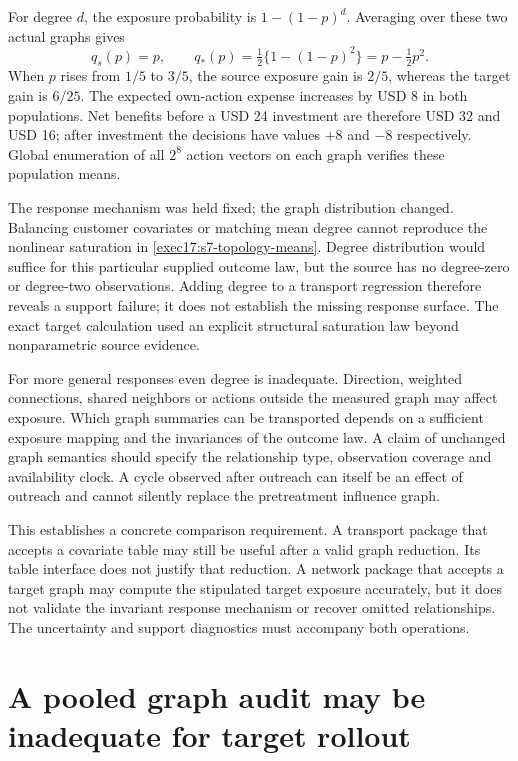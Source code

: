 For degree $d$, the exposure probability is $1-(1-p)^d$. Averaging over these
two actual graphs gives
\begin{equation}
 q_s(p)=p,\qquad q_*(p)=\tfrac12\{1-(1-p)^2\}
                    =p-\tfrac12p^2.
 \label{exec17:s7-topology-means}
\end{equation}
When $p$ rises from $1/5$ to $3/5$, the source exposure gain is $2/5$,
whereas the target gain is $6/25$. The expected own-action expense increases
by USD 8 in both populations. Net benefits before a USD 24 investment are
therefore USD 32 and USD 16; after investment the decisions have values
$+8$ and $-8$ respectively. Global enumeration of all $2^8$ action vectors
on each graph verifies these population means.\citep{exec17_s7_math}

The response mechanism was held fixed; the graph distribution changed.
Balancing customer covariates or matching mean degree cannot reproduce the
nonlinear saturation in \eqref{exec17:s7-topology-means}. Degree distribution
would suffice for this particular supplied outcome law, but the source has
no degree-zero or degree-two observations. Adding degree to a transport
regression therefore reveals a support failure; it does not establish the
missing response surface. The exact target calculation used an explicit
structural saturation law beyond nonparametric source evidence.

For more general responses even degree is inadequate. Direction, weighted
connections, shared neighbors or actions outside the measured graph may affect
exposure. Which graph summaries can be transported depends on a sufficient
exposure mapping and the invariances of the outcome law. A claim of unchanged
graph semantics should specify the relationship type, observation coverage and
availability clock. A cycle observed after outreach can itself be an effect of
outreach and cannot silently replace the pretreatment influence graph.

This establishes a concrete comparison requirement. A transport package that
accepts a covariate table may still be useful after a valid graph reduction.
Its table interface does not justify that reduction. A network package that
accepts a target graph may compute the stipulated target exposure accurately,
but it does not validate the invariant response mechanism or recover omitted
relationships. The uncertainty and support diagnostics must accompany both
operations.

\section{A pooled graph audit may be inadequate for target rollout}
\label{exec17:s7-pooled}

